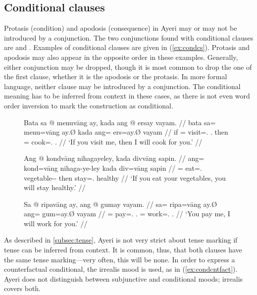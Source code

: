 
\subsection{Conditional clauses}
\label{subsec:condcs}

Protasis (condition) and apodosis (consequence) in Ayeri may or may not be
introduced by a conjunction. The two conjunctions found with conditional
clauses are  and .
Examples of conditional clauses are given in (\ref{ex:condcs}). Protasis and
apodosis may also appear in the opposite order in these examples. Generally,
either conjunction may be dropped, though it is most common to drop the one of
the first clause, whether it is the apodosis or the protasis. In more formal
language, neither clause may be introduced by a conjunction. The conditional
meaning has to be inferred from context in these cases, as there is not even
word order inversion to mark the construction as conditional.

\begin{figure}
\pex\label{ex:condcs}
\a\label{ex:condcs_1}\begingl
	\gla Bata sa @ menuvāng ay, kada ang @ ersay vayam. //
	\glb bata sa= menu=vāng ay.Ø kada ang= ers=ay.Ø vayam //
	\glc if \PatT{}= visit=\Second.\Aarg{} \Fsg{}.\Top{} then \AgtT{}=
		cook=\Fsg{}.\Top{} \Second.\Dat{} //
	\glft `If you visit me, then I will cook for you.' //
\endgl

\a\label{ex:condcs_2}\begingl
	\gla Ang @ kondvāng nihagayeley, kada divvāng sapin. //
	\glb ang= kond=vāng nihaga-ye-ley kada div=vāng sapin //
	\glc \AgtT{}= eat=\Second.\Aarg{} vegetable-\Pl{}-\PargI{} then
		stay=\Second{}.\Aarg{} healthy //
	\glft `If you eat your vegetables, you will stay healthy.' //
\endgl

\a\label{ex:condcs_3}\begingl
	\gla Sa @ ripavāng ay, ang @ gumay vayam. //
	\glb sa= ripa=vāng ay.Ø ang= gum=ay.Ø vayam //
	\glc \PatT{}= pay=\Second{}.\Aarg{} \Fsg{}.\Top{} \Aarg{}=
		work=\Fsg{}.\Aarg{} \Second{}.\Dat{} //
	\glft `You pay me, I will work for you.' //
\endgl

\xe
\end{figure}

As described in \autoref{subsec:tense}, Ayeri is not very strict about tense
marking if tense can be inferred from context. It is common, thus, that both
clauses have the same tense marking---very often, this will be none. In order
to express a counterfactual conditional, the irrealis mood is used, as in 
(\ref{ex:condcntfact}). Ayeri does not distinguish between subjunctive and
conditional moods; irrealis covers both.

